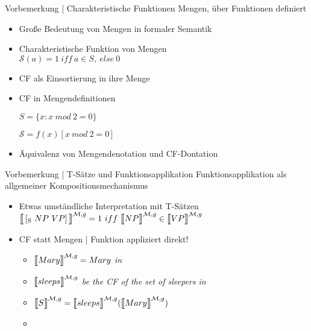 \begin{frame}
  {Vorbemerkung | Charakteristische Funktionen}
  \onslide<+->
  \onslide<+->
  Mengen, über Funktionen definiert\\
  \Halbzeile
  \begin{itemize}[<+->]
    \item Große Bedeutung von Mengen in formaler Semantik
      \Halbzeile
    \item Charakteristische Funktion von Mengen\\
      \alert{$\mathcal{S}(a) = 1\ iff\ a\in{}S,\ else\ 0$}
    \item CF als Einsortierung in ihre Menge
    \item CF in Mengendefinitionen\\
      \rule{0em}{1em}$S=\{x: x\ mod\ 2=0\}$\\
      \rule{0em}{1em}$\mathcal{S}=f(x)[x\ mod\ 2=0]$\\
      \Halbzeile
    \item \alert{Äquivalenz von Mengendenotation und CF-Dontation}
  \end{itemize}
\end{frame}

\begin{frame}
  {Vorbemerkung | T-Sätze und Funktionsapplikation}
  \onslide<+->
  \onslide<+->
  Funktionsapplikation als allgemeiner Kompositionsmechanismus\\
  \Halbzeile
  \begin{itemize}[<+->]
    \item Etwas umständliche Interpretation mit T-Sätzen\\
      \alert{$\Dem{\ekm{\Sub{S}\ NP\ VP}}{\mMm,g} = 1\ iff\ \Dem{NP}{\mMm,g}\in{}\Dem{VP}{\mMm,g}$}
      \Halbzeile
    \item CF statt Mengen | \alert{Funktion appliziert direkt!}\\
      \begin{itemize}[<+->]
        \item $\Dem{Mary}{\mMm,g}=Mary$ \emph{in \mM}
        \item $\Dem{sleeps}{\mMm,g}$ \emph{be the CF of the set of sleepers in \mM}
        \item \alert{$\Dem{S}{\mMm,g}=\Dem{sleeps}{\mMm,g}(\Dem{Mary}{\mMm,g})$}
        \item {}
      \end{itemize}
  \end{itemize}
\end{frame}

